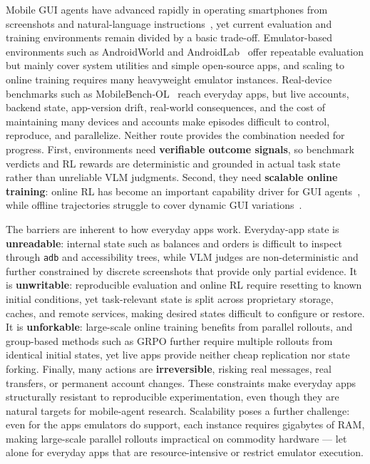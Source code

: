 \documentclass[11pt]{article}
\begin{document}
Mobile GUI agents have advanced rapidly in operating smartphones from screenshots and natural-language instructions~\cite{UITARS,AutoGLM,UIVenus15,GUIOw15,UIGenie}, yet current evaluation and training environments remain divided by a basic trade-off. Emulator-based environments such as AndroidWorld and AndroidLab~\cite{AndroidWorld,AndroidLab} offer repeatable evaluation but mainly cover system utilities and simple open-source apps, and scaling to online training requires many heavyweight emulator instances. Real-device benchmarks such as MobileBench-OL~\cite{MobileBenchOL} reach everyday apps, but live accounts, backend state, app-version drift, real-world consequences, and the cost of maintaining many devices and accounts make episodes difficult to control, reproduce, and parallelize. Neither route provides the combination needed for progress. First, environments need \textbf{verifiable outcome signals}, so benchmark verdicts and RL rewards are deterministic and grounded in actual task state rather than unreliable VLM judgments. Second, they need \textbf{scalable online training}: online RL has become an important capability driver for GUI agents~\cite{UIVenus15,UITARS2,AgentCPMGUI}, while offline trajectories struggle to cover dynamic GUI variations~\cite{MAIUI}.

The barriers are inherent to how everyday apps work. Everyday-app state is \textbf{unreadable}: internal state such as balances and orders is difficult to inspect through \texttt{adb} and accessibility trees, while VLM judges are non-deterministic and further constrained by discrete screenshots that provide only partial evidence. It is \textbf{unwritable}: reproducible evaluation and online RL require resetting to known initial conditions, yet task-relevant state is split across proprietary storage, caches, and remote services, making desired states difficult to configure or restore. It is \textbf{unforkable}: large-scale online training benefits from parallel rollouts, and group-based methods such as GRPO further require multiple rollouts from identical initial states, yet live apps provide neither cheap replication nor state forking. Finally, many actions are \textbf{irreversible}, risking real messages, real transfers, or permanent account changes. These constraints make everyday apps structurally resistant to reproducible experimentation, even though they are natural targets for mobile-agent research. Scalability poses a further challenge: even for the apps emulators do support, each instance requires gigabytes of RAM, making large-scale parallel rollouts impractical on commodity hardware --- let alone for everyday apps that are resource-intensive or restrict emulator execution.
\end{document}

